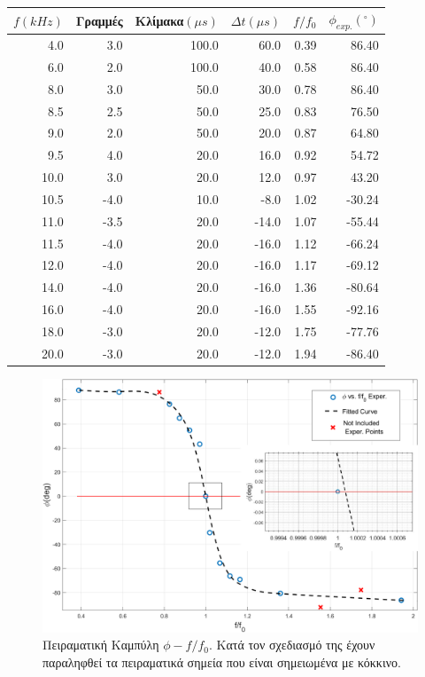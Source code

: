 \documentclass[a4paper]{article}
\begin{document}
\begin{table}[h!]
\centering
\caption{ }
\begin{tabular}{r|r|r|r|r|r}
$f(kHz)$ & Γραμμές & Κλίμακα$(\mu s)$ & $\Delta t (\mu s)$ & $f/f_0$ & $\phi_{exp.} (^\circ)$ \\
\hline\hline 
4.0&3.0&100.0&60.0&0.39&86.40\\ 
6.0&2.0&100.0&40.0&0.58&86.40\\ 
8.0&3.0&50.0&30.0&0.78&86.40\\ 
8.5&2.5&50.0&25.0&0.83&76.50\\ 
9.0&2.0&50.0&20.0&0.87&64.80\\ 
9.5&4.0&20.0&16.0&0.92&54.72\\ 
10.0&3.0&20.0&12.0&0.97 &43.20\\ 
10.5&-4.0&10.0&-8.0&1.02&-30.24\\ 
11.0&-3.5&20.0&-14.0&1.07&-55.44\\ 
11.5&-4.0&20.0&-16.0&1.12&-66.24\\ 
12.0&-4.0&20.0&-16.0&1.17&-69.12\\ 
14.0&-4.0&20.0&-16.0&1.36&-80.64\\ 
16.0&-4.0&20.0&-16.0&1.55&-92.16\\ 
18.0&-3.0&20.0&-12.0&1.75&-77.76\\ 
20.0&-3.0&20.0&-12.0&1.94&-86.40
\end{tabular}
\end{table}


\begin{figure}[h!]
\centering 
\caption{Πειραματική Καμπύλη $\phi-f/f_0$.  Κατά τον σχεδιασμό της έχουν παραληφθεί τα πειραματικά \text{\hspace{0.58in}} σημεία που είναι σημειωμένα με κόκκινο. }
\includegraphics[scale=0.6]{phi_data.png}
\end{figure}
\end{document}
